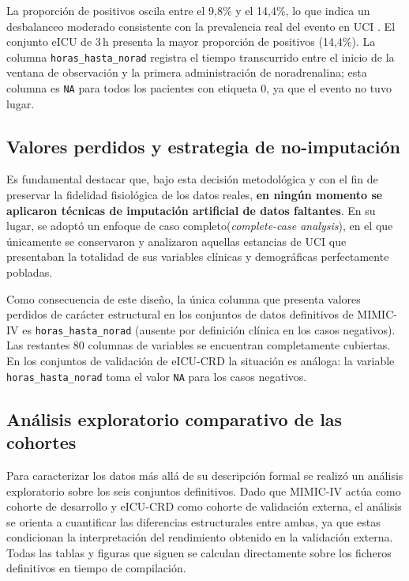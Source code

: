 \documentclass[
  spanish,
  a4paper,
  12pt,
  twoside]{memoir}
\begin{document}
La proporción de positivos oscila entre el 9,8\% y el 14,4\%, lo que indica un desbalanceo moderado consistente con la prevalencia real del evento en UCI \cite{firzli2023}. El conjunto eICU de 3\,h presenta la mayor proporción de positivos (14,4\%). La columna \texttt{horas\_hasta\_norad} registra el tiempo transcurrido entre el inicio de la ventana de observación y la primera administración de noradrenalina; esta columna es \texttt{NA} para todos los pacientes con etiqueta 0, ya que el evento no tuvo lugar.
 
\subsection*{Valores perdidos y estrategia de no-imputación}

Es fundamental destacar que, bajo esta decisión metodológica y con el fin de preservar la fidelidad fisiológica de los datos reales, \textbf{en ningún momento se aplicaron técnicas de imputación artificial de datos faltantes}. En su lugar, se adoptó un enfoque de caso completo(\textit{complete-case analysis}), en el que únicamente se conservaron y analizaron aquellas estancias de UCI que presentaban la totalidad de sus variables clínicas y demográficas perfectamente pobladas.

Como consecuencia de este diseño, la única columna que presenta valores perdidos de carácter estructural en los conjuntos de datos definitivos de MIMIC-IV es \texttt{horas\_hasta\_norad} (ausente por definición clínica en los casos negativos). Las restantes 80 columnas de variables se encuentran completamente cubiertas. En los conjuntos de validación de eICU-CRD la situación es análoga: la variable \texttt{horas\_hasta\_norad} toma el valor \texttt{NA} para los casos negativos.

\subsection*{Análisis exploratorio comparativo de las cohortes}

Para caracterizar los datos más allá de su descripción formal se realizó
un análisis exploratorio sobre los seis conjuntos definitivos. Dado que
MIMIC-IV actúa como cohorte de desarrollo y eICU-CRD como cohorte de
validación externa, el análisis se orienta a cuantificar las diferencias
estructurales entre ambas, ya que estas condicionan la interpretación
del rendimiento obtenido en la validación externa. Todas las tablas y
figuras que siguen se calculan directamente sobre los ficheros
definitivos en tiempo de compilación.
\end{document}
